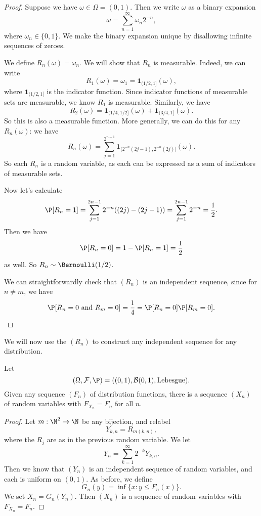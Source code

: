 \documentclass[a4paper]{article}
\begin{document}
\begin{proof}
  Suppose we have $\omega \in \Omega = (0, 1)$. Then we write $\omega$ as a binary expansion
  \[
    \omega = \sum_{n = 1}^\infty \omega_n 2^{-n},
  \]
  where $\omega_n \in \{0, 1\}$. We make the binary expansion unique by disallowing infinite sequences of zeroes.

  We define $R_n(\omega) = \omega_n$. We will show that $R_n$ is measurable. Indeed, we can write
  \[
    R_1(\omega) = \omega_1 = \mathbf{1}_{(1/2, 1]}(\omega),
  \]
  where $\mathbf{1}_{(1/2, 1]}$ is the indicator function. Since indicator functions of measurable sets are measurable, we know $R_1$ is measurable. Similarly, we have
  \[
    R_2(\omega) = \mathbf{1}_{(1/4, 1/2]}(\omega) + \mathbf{1}_{(3/4, 1]}(\omega).
  \]
  So this is also a measurable function. More generally, we can do this for any $R_n(\omega)$: we have
  \[
    R_n(\omega) = \sum_{j = 1}^{2^{n - 1}} \mathbf{1}_{(2^{-n}(2j - 1), 2^{-n}(2j)]} (\omega).
  \]
  So each $R_n$ is a random variable, as each can be expressed as a sum of indicators of measurable sets.

  Now let's calculate
  \[
    \P[R_n = 1] = \sum_{j = 1}^{2n - 1} 2^{-n}((2j) - (2j - 1)) = \sum_{j = 1}^{2n - 1} 2^{-n} = \frac{1}{2}.
  \]
  Then we have
  \[
    \P[R_n = 0] = 1 - \P[R_n = 1] = \frac{1}{2}
  \]
  as well. So $R_n \sim \Bernoulli(1/2)$.

  We can straightforwardly check that $(R_n)$ is an independent sequence, since for $n \not= m$, we have
  \[
    \P[R_n = 0 \text{ and }R_m = 0] = \frac{1}{4} = \P[R_n = 0] \P[R_m = 0].
  \]
\end{proof}

We will now use the $(R_n)$ to construct any independent sequence for any distribution.

\begin{prop}
  Let
  \[
    (\Omega, \mathcal{F}, \P) = ((0, 1), \mathcal{B}(0, 1), \text{Lebesgue}).
  \]
  Given any sequence $(F_n)$ of distribution functions, there is a sequence $(X_n)$ of random variables with $F_{X_n} = F_n$ for all $n$.
\end{prop}

\begin{proof}
  Let $m: \N^2 \to \N$ be any bijection, and relabel
  \[
    Y_{k, n} = R_{m(k, n)},
  \]
  where the $R_j$ are as in the previous random variable. We let
  \[
    Y_n = \sum_{k = 1}^\infty 2^{-k} Y_{k, n}.
  \]
  Then we know that $(Y_n)$ is an independent sequence of random variables, and each is uniform on $(0, 1)$. As before, we define
  \[
    G_n(y) = \inf\{x: y \leq F_n(x)\}.
  \]
  We set $X_n = G_n(Y_n)$. Then $(X_n)$ is a sequence of random variables with $F_{X_n} = F_n$.
\end{proof}
\end{document}
